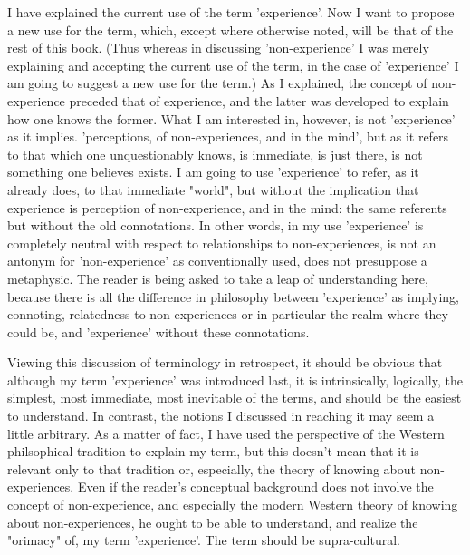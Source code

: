 \documentclass[10pt,twoside]{memoir}
\begin{document}
\begin{enumerate}
{I have explained the current use of the term 'experience'. Now I want 
to propose a new use for the term, which, except where otherwise noted, 
will be that of the rest of this book. (Thus whereas in discussing 
'non-experience' I was merely explaining and accepting the current use of 
the term, in the case of 'experience' I am going to suggest a new use for the 
term.) As I explained, the concept of non-experience preceded that of 
experience, and the latter was developed to explain how one knows the 
former. What I am interested in, however, is not 'experience' as it implies. 
'perceptions, of non-experiences, and in the mind', but as it refers to that 
which one unquestionably knows, is immediate, is just there, is not 
something one believes exists. I am going to use 'experience' to refer, as it 
already does, to that immediate "world", but without the implication that 
experience is perception of non-experience, and in the mind: the same 
referents but without the old connotations. In other words, in my use 
'experience' is completely neutral with respect to relationships to 
non-experiences, is not an antonym for 'non-experience' as conventionally 
used, does not presuppose a metaphysic. The reader is being asked to take a 
leap of understanding here, because there is all the difference in philosophy 
between 'experience' as implying, connoting, relatedness to non-experiences 
or in particular the realm where they could be, and 'experience' without 
these connotations. 

Viewing this discussion of terminology in retrospect, it should be 
obvious that although my term 'experience' was introduced last, it is 
intrinsically, logically, the simplest, most immediate, most inevitable of the 
terms, and should be the easiest to understand. In contrast, the notions I 
discussed in reaching it may seem a little arbitrary. As a matter of fact, I 
have used the perspective of the Western philsophical tradition to explain my 
term, but this doesn't mean that it is relevant only to that tradition or, 
especially, the theory of knowing about non-experiences. Even if the reader's 
conceptual background does not involve the concept of non-experience, and 
especially the modern Western theory of knowing about non-experiences, he 
ought to be able to understand, and realize the "orimacy" of, my term 
'experience'. The term should be supra-cultural. 

}
\end{enumerate}
\end{document}
